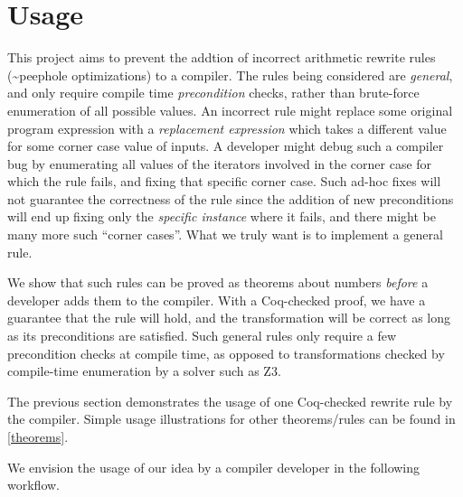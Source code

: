 \hypertarget{usage}{%
\section{Usage}\label{usage}}

This project aims to prevent the addtion of incorrect arithmetic rewrite
rules (\textasciitilde peephole optimizations) to a compiler. The rules
being considered are \emph{general}, and only require compile time
\emph{precondition} checks, rather than brute-force enumeration of all
possible values. An incorrect rule might replace some original program
expression with a \emph{replacement expression} which takes a different
value for some corner case value of inputs. A developer might debug such
a compiler bug by enumerating all values of the iterators involved in
the corner case for which the rule fails, and fixing that specific
corner case. Such ad-hoc fixes will not guarantee the correctness of the
rule since the addition of new preconditions will end up fixing only the
\emph{specific instance} where it fails, and there might be many more
such ``corner cases''. What we truly want is to implement a general
rule.

We show that such rules can be proved as theorems about numbers
\emph{before} a developer adds them to the compiler. With a Coq-checked
proof, we have a guarantee that the rule will hold, and the
transformation will be correct as long as its preconditions are
satisfied. Such general rules only require a few precondition checks at
compile time, as opposed to transformations checked by compile-time
enumeration by a solver such as Z3.

The previous section demonstrates the usage of one Coq-checked rewrite
rule by the compiler. Simple usage illustrations for other
theorems/rules can be found in \autoref{theorems}.

We envision the usage of our idea by a compiler developer in the
following workflow.


